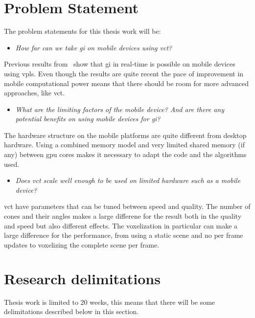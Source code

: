 \documentclass[a4paper, 12pt]{article}
\begin{document}
\section{Problem Statement}
\label{sec:Problem Statement}

The problem statements for this thesis work will be:

\begin{itemize}
  \item \textit{How far can we take \gls{gi} on mobile devices using \gls{vct}?}
\end{itemize}

Previous results from~\cite{gimobile} show that \gls{gi} in real-time is possible on mobile devices using \glspl{vpl}. Even though the results are quite recent the pace of improvement in mobile computational power means that there should be room for more advanced approaches, like \gls{vct}.

\begin{itemize}
  \item \textit{What are the limiting factors of the mobile device? And are there any potential benefits on using mobile devices for \gls{gi}?}
\end{itemize}

The hardware structure on the mobile platforms are quite different from desktop hardware. Using a combined memory model and very limited shared memory (if any) between \gls{gpu} cores makes it necessary to adapt the code and the algorithms used.

\begin{itemize}
  \item \textit{Does \gls{vct} scale well enough to be used on limited hardware such as a mobile device?}
\end{itemize}

\gls{vct} have parameters that can be tuned between speed and quality. The number of cones and their angles makes a large differene for the result both in the quality and speed but also different effects. The voxelization in particular can make a large difference for the performance, from using a static scene and no per frame updates to voxelizing the complete scene per frame.

\section{Research delimitations}
\label{sec:Research delimitations}

Thesis work is limited to 20 weeks, this means that there will be some delimitations described below in this section.
\end{document}
